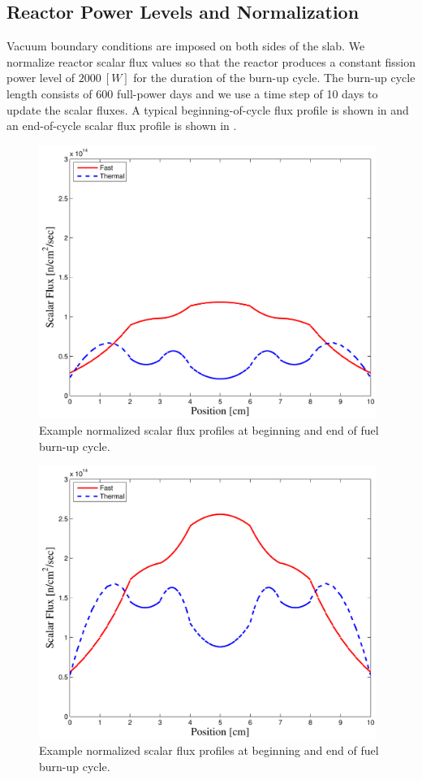 \subsection{Reactor Power Levels and Normalization}

Vacuum boundary conditions are imposed on both sides of the slab.  
We normalize reactor scalar flux values so that the reactor produces a constant fission power level of $2000~[W]$ for the duration of the burn-up cycle.
The burn-up cycle length consists of 600 full-power days and we use a time step of 10 days to update the scalar fluxes.
A typical beginning-of-cycle flux profile is shown in  and an end-of-cycle scalar flux profile is shown in .  
\begin{figure}[!htp]
\centering
\includegraphics[width=11cm]{chapter5_depletion/P1_Lobatto_full_80_cells_t_steps60_End_600_Power_2000__BOC_Flux.pdf}
\caption{Example normalized scalar flux profiles at beginning and end of fuel burn-up cycle.}
\label{fig:ex_boc_cycle}
\end{figure}
%
\begin{figure}[!htp]
\centering
\includegraphics[width=11cm]{chapter5_depletion/P1_Lobatto_full_80_cells_t_steps60_End_600_Power_2000__EOC_Flux.pdf}
\caption{Example normalized scalar flux profiles at beginning and end of fuel burn-up cycle.}
\label{fig:ex_eoc_cycle}
\end{figure}

